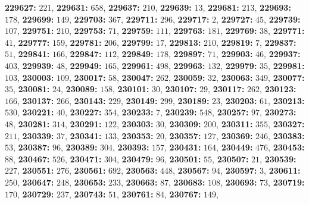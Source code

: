 \textsf{\bfseries 229627:} $221$, \textsf{\bfseries 229631:} $658$, \textsf{\bfseries 229637:} $210$, \textsf{\bfseries 229639:} $13$, \textsf{\bfseries 229681:} $213$, \textsf{\bfseries 229693:} $178$, \textsf{\bfseries 229699:} $149$, \textsf{\bfseries 229703:} $367$, \textsf{\bfseries 229711:} $296$, \textsf{\bfseries 229717:} $2$, \textsf{\bfseries 229727:} $45$, \textsf{\bfseries 229739:} $107$, \textsf{\bfseries 229751:} $210$, \textsf{\bfseries 229753:} $71$, \textsf{\bfseries 229759:} $111$, \textsf{\bfseries 229763:} $181$, \textsf{\bfseries 229769:} $38$, \textsf{\bfseries 229771:} $41$, \textsf{\bfseries 229777:} $159$, \textsf{\bfseries 229781:} $206$, \textsf{\bfseries 229799:} $17$, \textsf{\bfseries 229813:} $210$, \textsf{\bfseries 229819:} $7$, \textsf{\bfseries 229837:} $51$, \textsf{\bfseries 229841:} $166$, \textsf{\bfseries 229847:} $112$, \textsf{\bfseries 229849:} $178$, \textsf{\bfseries 229897:} $71$, \textsf{\bfseries 229903:} $46$, \textsf{\bfseries 229937:} $403$, \textsf{\bfseries 229939:} $48$, \textsf{\bfseries 229949:} $165$, \textsf{\bfseries 229961:} $498$, \textsf{\bfseries 229963:} $132$, \textsf{\bfseries 229979:} $35$, \textsf{\bfseries 229981:} $103$, \textsf{\bfseries 230003:} $109$, \textsf{\bfseries 230017:} $58$, \textsf{\bfseries 230047:} $262$, \textsf{\bfseries 230059:} $32$, \textsf{\bfseries 230063:} $349$, \textsf{\bfseries 230077:} $35$, \textsf{\bfseries 230081:} $24$, \textsf{\bfseries 230089:} $158$, \textsf{\bfseries 230101:} $30$, \textsf{\bfseries 230107:} $29$, \textsf{\bfseries 230117:} $262$, \textsf{\bfseries 230123:} $166$, \textsf{\bfseries 230137:} $266$, \textsf{\bfseries 230143:} $229$, \textsf{\bfseries 230149:} $299$, \textsf{\bfseries 230189:} $23$, \textsf{\bfseries 230203:} $61$, \textsf{\bfseries 230213:} $530$, \textsf{\bfseries 230221:} $40$, \textsf{\bfseries 230227:} $354$, \textsf{\bfseries 230233:} $7$, \textsf{\bfseries 230239:} $548$, \textsf{\bfseries 230257:} $97$, \textsf{\bfseries 230273:} $48$, \textsf{\bfseries 230281:} $314$, \textsf{\bfseries 230291:} $122$, \textsf{\bfseries 230303:} $30$, \textsf{\bfseries 230309:} $200$, \textsf{\bfseries 230311:} $355$, \textsf{\bfseries 230327:} $211$, \textsf{\bfseries 230339:} $37$, \textsf{\bfseries 230341:} $133$, \textsf{\bfseries 230353:} $20$, \textsf{\bfseries 230357:} $127$, \textsf{\bfseries 230369:} $246$, \textsf{\bfseries 230383:} $53$, \textsf{\bfseries 230387:} $96$, \textsf{\bfseries 230389:} $304$, \textsf{\bfseries 230393:} $157$, \textsf{\bfseries 230431:} $164$, \textsf{\bfseries 230449:} $476$, \textsf{\bfseries 230453:} $88$, \textsf{\bfseries 230467:} $526$, \textsf{\bfseries 230471:} $304$, \textsf{\bfseries 230479:} $96$, \textsf{\bfseries 230501:} $55$, \textsf{\bfseries 230507:} $21$, \textsf{\bfseries 230539:} $227$, \textsf{\bfseries 230551:} $276$, \textsf{\bfseries 230561:} $692$, \textsf{\bfseries 230563:} $448$, \textsf{\bfseries 230567:} $94$, \textsf{\bfseries 230597:} $3$, \textsf{\bfseries 230611:} $250$, \textsf{\bfseries 230647:} $248$, \textsf{\bfseries 230653:} $233$, \textsf{\bfseries 230663:} $87$, \textsf{\bfseries 230683:} $108$, \textsf{\bfseries 230693:} $73$, \textsf{\bfseries 230719:} $170$, \textsf{\bfseries 230729:} $237$, \textsf{\bfseries 230743:} $51$, \textsf{\bfseries 230761:} $84$, \textsf{\bfseries 230767:} $149$, 
